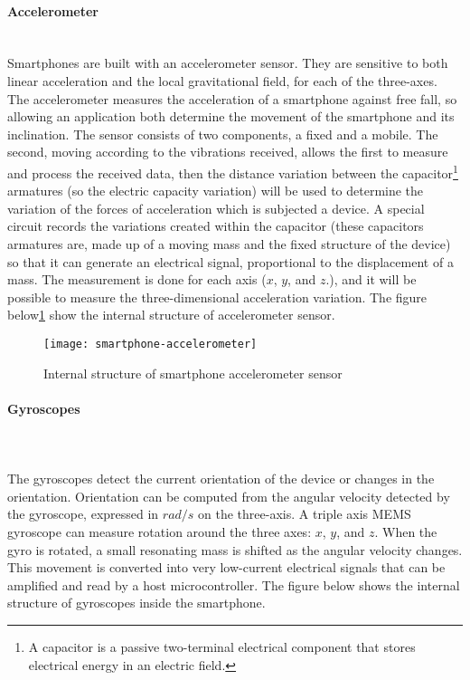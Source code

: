 \documentclass[tesi]{subfiles}
\begin{document}
\clearpage
\paragraph{{\Large Accelerometer}}\leavevmode\\
Smartphones are built with an accelerometer sensor. 
They are sensitive to both linear acceleration and the local gravitational field, for each of the three-axes. The accelerometer measures the acceleration of a smartphone against free fall, so allowing an application both determine the movement of the smartphone and its inclination.
The sensor consists of two components, a fixed and a mobile. 
The second, moving according to the vibrations received, allows the first to measure and process the received data, then the distance variation between the capacitor\footnote{A capacitor is a passive two-terminal electrical component that stores electrical energy in an electric field.} armatures (so the electric capacity variation) will be used to determine the variation of the forces of acceleration which is subjected a device. A special circuit records the variations created within the capacitor (these capacitors armatures are, made up of a moving mass and the fixed structure of the device) so that it can generate an electrical signal, proportional to the displacement of a mass.
The measurement is done for each axis ($x$, $y$, and $z$.), and it will be possible to measure the three-dimensional acceleration variation.
The figure below\ref{fig:Sample smartphone accelerometer sensors} show the internal structure of accelerometer sensor.
\vspace{1.5cm}
\begin{figure}[H]
\centering
\texttt{[image: smartphone-accelerometer]}
\caption{Internal structure of smartphone accelerometer sensor}
\label{fig:Sample smartphone accelerometer sensors}
\end{figure}
\clearpage
\paragraph{{\Large Gyroscopes}}\leavevmode\\\\
The gyroscopes detect the current orientation of the device or
changes in the orientation.
Orientation can be computed from the angular velocity detected by the gyroscope, expressed in $rad/s$ on the three-axis.  
A triple axis MEMS gyroscope can measure rotation around the three axes: $x$, $y$, and $z$.
When the gyro is rotated, a small resonating mass is shifted as the angular velocity changes. This movement is converted into very low-current electrical signals that can be amplified and read by a host microcontroller.
The figure below shows the internal structure of gyroscopes inside the smartphone.
\end{document}
